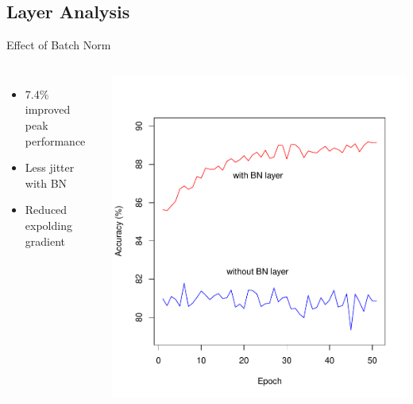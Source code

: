 \documentclass[aspectratio=1610, 12pt]{beamer}
\begin{document}
\subsection{Layer Analysis}
\begin{frame}{Effect of Batch Norm}
 	\begin{columns}
 		\begin{itemize}
 			\item 7.4\% improved peak performance
 			\item Less jitter with BN
 			\item Reduced expolding gradient
 		\end{itemize}
 		
 		\centering
 		\includegraphics[scale=0.45]{images/batchnorm_measurement.pdf}
 	\end{columns}
\end{frame}
\end{document}
